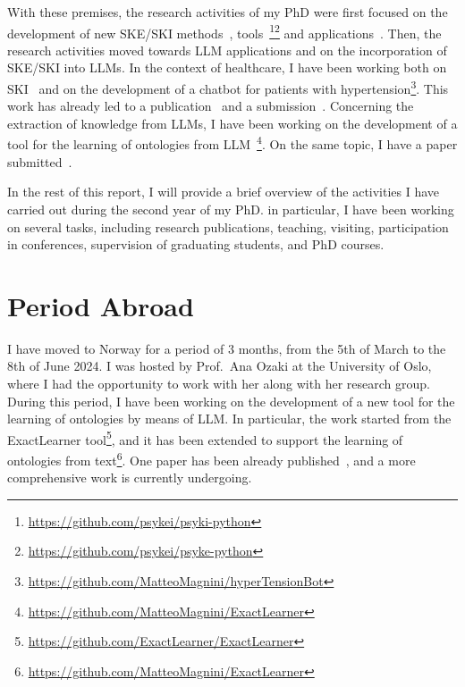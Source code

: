 \documentclass[11pt]{article}
\begin{document}
With these premises, the research activities of my PhD were first focused on the development of new \ac{SKE}/\ac{SKI} methods~\cite{DBLP:journals/logcom/MagniniCO23,DBLP:conf/woa/MagniniCO22,DBLP:conf/cilc/MagniniCO22}, tools~\cite{DBLP:conf/atal/MagniniCO22}\footnote{\url{https://github.com/psykei/psyki-python}}\footnote{\url{https://github.com/psykei/psyke-python}} and applications~\cite{DBLP:journals/cmpb/MagniniCCAO23,DBLP:conf/extraamas/CiattoMBAO23}.
%
Then, the research activities moved towards \ac{LLM} applications and on the incorporation of \ac{SKE}/\ac{SKI} into \acp{LLM}.
%
In the context of healthcare, I have been working both on \ac{SKI}~\cite{DBLP:conf/hc/Magnini24} and on the development of a chatbot for patients with hypertension\footnote{\url{https://github.com/MatteoMagnini/hyperTensionBot}}.
%
This work has already led to a publication~\cite{DBLP:conf/percom/MontagnaAFPKUM24} and a submission~\cite{DBLP:conf/hc/Aguzzi24}.
%
Concerning the extraction of knowledge from \acp{LLM}, I have been working on the development of a tool for the learning of ontologies from \ac{LLM}~\cite{DBLP:conf/dlog/MagniniOS24}\footnote{\url{https://github.com/MatteoMagnini/ExactLearner}}.
%
On the same topic, I have a paper submitted~\cite{DBLP:journals/kbs/CiattoKB24}.

In the rest of this report, I will provide a brief overview of the activities I have carried out during the second year of my PhD\@.
%
in particular, I have been working on several tasks, including research publications, teaching, visiting, participation in conferences, supervision of graduating students, and PhD courses.


\section{Period Abroad}\label{sec:period-abroad}
I have moved to Norway for a period of 3 months, from the 5th of March to the 8th of June 2024.
%
I was hosted by Prof.~Ana Ozaki at the University of Oslo, where I had the opportunity to work with her along with her research group.
%
During this period, I have been working on the development of a new tool for the learning of ontologies by means of \ac{LLM}.
%
In particular, the work started from the ExactLearner tool\footnote{\url{https://github.com/ExactLearner/ExactLearner}}, and it has been extended to support the learning of ontologies from text\footnote{\url{https://github.com/MatteoMagnini/ExactLearner}}.
%
One paper has been already published~\cite{DBLP:conf/dlog/MagniniOS24}, and a more comprehensive work is currently undergoing.
\end{document}
